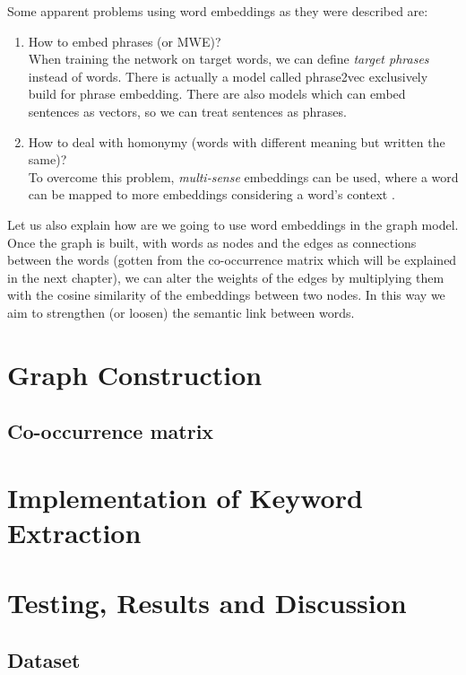 \documentclass[12pt]{article}
\numberwithin{equation}{section}
\begin{document}
\begin{spacing}{1.5}
	Some apparent problems using word embeddings as they were described are:
	\begin{enumerate}
		\item How to embed phrases (or MWE)?\\
		When training the network on target words, we can define \textit{target phrases} instead of words. There is actually a model called phrase2vec exclusively build for phrase embedding. There are also models which can embed sentences as vectors, so we can treat sentences as phrases.
		\item How to deal with homonymy (words with different meaning but written the same)? \\
		To overcome this problem, \textit{multi-sense} embeddings can be used, where a word can be mapped to more embeddings considering a word's context \cite{multi_sense_we}. 
	\end{enumerate}
	
	Let us also explain how are we going to use word embeddings in the graph model. Once the graph is built, with words as nodes and the edges as connections between the words (gotten from the co-occurrence matrix which will be explained in the next chapter), we can alter the weights of the edges by multiplying them with the cosine similarity of the embeddings between two nodes. In this way we aim to strengthen (or loosen) the semantic link between words.
	
	\newpage
	\section{Graph Construction}
	\subsection{Co-occurrence matrix}
	
	\newpage
	\section{Implementation of Keyword Extraction}
	
	\section{Testing, Results and Discussion}
	
	\subsection{Dataset}
	

\end{spacing}
\end{document}
